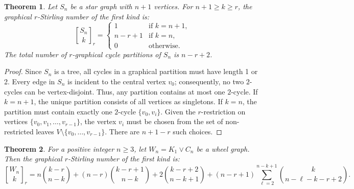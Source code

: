 \documentclass{amsart}
\newcounter{cases}
\newtheorem{theorem}{Theorem}[section]
\theoremstyle{definition}
\begin{document}
\begin{theorem}
Let $S_n$ be a star graph with $n+1$ vertices. For $n+1 \geq k \geq r$, the graphical $r$-Stirling number of the first kind is:
\begin{equation*}
    {S_n \brack k}_r = \begin{cases} 
    1 & \text{if } k = n+1, \\
    n-r+1 & \text{if } k = n, \\
    0 & \text{otherwise}.
    \end{cases}
\end{equation*}
The total number of $r$-graphical cycle partitions of $S_n$ is $n-r+2$.
\end{theorem}

\begin{proof}
Since $S_n$ is a tree, all cycles in a graphical partition must have length 1 or 2. Every edge in $S_n$ is incident to the central vertex $v_0$; consequently, no two $2$-cycles can be vertex-disjoint. Thus, any partition contains at most one $2$-cycle.
If $k=n+1$, the unique partition consists of all vertices as singletons.
If $k=n$, the partition must contain exactly one $2$-cycle $\{v_0, v_i\}$. Given the $r$-restriction on vertices $\{v_0, v_1, \dots, v_{r-1}\}$, the vertex $v_i$ must be chosen from the set of non-restricted leaves $V \setminus \{v_0, \dots, v_{r-1}\}$. There are $n+1-r$ such choices.
\end{proof}
\begin{theorem}\label{Whe}
For a positive integer $n \geq 3$, let $W_n = K_1 \vee C_n$ be a wheel graph. Then the graphical $r$-Stirling number of the first kind is:
\begin{equation*}
{W_n \brack k}_r = n \binom{k-r}{n-k} + (n-r) \binom{k-r+1}{n-k} + 2 \binom{k-r+2}{n-k+1} + (n-r+1) \sum_{\ell=2}^{n-k+1} \binom{k}{n-\ell-k-r+2}.
\end{equation*}
\end{theorem}
\end{document}
